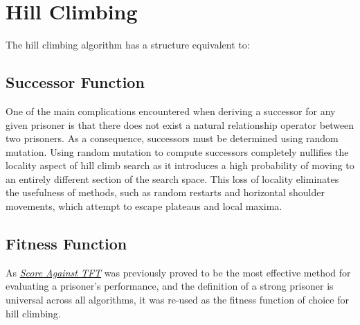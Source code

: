 \documentclass[12pt]{article}
\begin{document}
\section{Hill Climbing}

The hill climbing algorithm has a structure equivalent to: \\

\begin{algorithm}[H]
\end{algorithm}

\subsection {Successor Function}

One of the main complications encountered when deriving a successor for any given prisoner
is that there does not exist a natural relationship operator between two prisoners.
As a consequence, successors must be determined using random mutation.  Using
random mutation to compute successors completely nullifies the locality aspect
of hill climb search as it introduces a high probability of moving to an entirely different
section of the search space.  This loss of locality eliminates the usefulness of
methods, such as random restarts and horizontal shoulder movements, which attempt to
escape plateaus and local maxima.

\subsection {Fitness Function}

As \textit{\hyperref[tft]{Score Against TFT}} was previously proved to be the most
effective method for evaluating a prisoner's performance, and the definition
of a strong prisoner is universal across all algorithms, it was re-used as the fitness
function of choice for hill climbing.

\pagebreak
\end{document}
